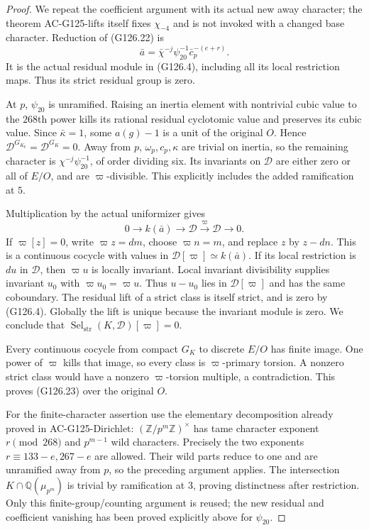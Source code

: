 \begin{proof}
We repeat the coefficient argument with its actual new
away character; the theorem AC-G125-lifts itself fixes
\(\chi_{-4}\) and is not invoked with a changed base character.
Reduction of (G126.22) is
\[
                 \bar a=\bar\chi^{-j}\psi_{20}^{-1}
                                             \bar c_p^{-(e+r)}.
 \tag{G126.24}
\]
It is the actual residual module in (G126.4), including
all its local restriction maps.  Thus its strict
residual group is zero.

At \(p\), \(\psi_{20}\) is unramified.  Raising an
inertia element with nontrivial cubic value to the
\(268\)th power kills its rational residual cyclotomic
value and preserves its cubic value.
Since \(\bar\kappa=1\), some \(a(g)-1\) is a unit of
the original \(O\).  Hence
\(\mathcal D^{G_{K_p}}=\mathcal D^{G_K}=0\).
Away from \(p\), \(\omega_p,c_p,\kappa\) are trivial
on inertia, so the remaining character is
\(\chi^{-j}\psi_{20}^{-1}\), of order dividing six.
Its invariants on \(\mathcal D\) are either zero or
all of \(E/O\), and are \(\varpi\)-divisible.
This explicitly includes the added ramification at \(5\).

Multiplication by the actual uniformizer gives
\[
       0\longrightarrow k(\bar a)\longrightarrow
        \mathcal D\xrightarrow{\varpi}\mathcal D\longrightarrow0.
 \tag{G126.25}
\]
If \(\varpi[z]=0\), write \(\varpi z=dm\), choose
\(\varpi n=m\), and replace \(z\) by \(z-dn\).
This is a continuous cocycle with values in
\(\mathcal D[\varpi]\simeq k(\bar a)\).
If its local restriction is \(du\) in \(\mathcal D\),
then \(\varpi u\) is locally invariant.
Local invariant divisibility supplies invariant \(u_0\)
with \(\varpi u_0=\varpi u\).
Thus \(u-u_0\) lies in \(\mathcal D[\varpi]\) and has
the same coboundary.  The residual lift of a strict
class is itself strict, and is zero by (G126.4).
Globally the lift is unique because the invariant
module is zero.  We conclude that
\(\operatorname{Sel}_{\mathrm{str}}(K,\mathcal D)[\varpi]=0\).

Every continuous cocycle from compact \(G_K\) to
discrete \(E/O\) has finite image.  One power of
\(\varpi\) kills that image, so every class is
\(\varpi\)-primary torsion.
A nonzero strict class would have a nonzero
\(\varpi\)-torsion multiple, a contradiction.
This proves (G126.23) over the original \(O\).

For the finite-character assertion use the elementary
decomposition already proved in AC-G125-Dirichlet:
\((\mathbb Z/p^m\mathbb Z)^\times\) has tame character
exponent \(r\pmod {268}\) and \(p^{m-1}\) wild
characters.  Precisely the two exponents
\(r\equiv133-e,267-e\) are allowed.
Their wild parts reduce to one and are unramified
away from \(p\), so the preceding argument applies.
The intersection \(K\cap\mathbb Q(\mu_{p^m})\) is
trivial by ramification at \(3\), proving distinctness
after restriction.
Only this finite-group/counting argument is reused;
the new residual and coefficient vanishing has been
proved explicitly above for \(\psi_{20}\).
\end{proof}

